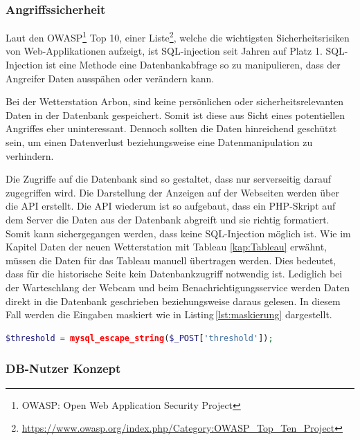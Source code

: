 \subsubsection{Angriffssicherheit}
Laut den OWASP\footnote{OWASP: Open Web Application Security Project} Top 10, einer Liste\footnote{ \url{https://www.owasp.org/index.php/Category:OWASP_Top_Ten_Project}}, welche die wichtigsten Sicherheitsrisiken von Web-Applikationen aufzeigt, ist SQL-injection seit Jahren auf Platz 1. SQL-Injection ist eine Methode eine Datenbankabfrage so zu manipulieren, dass der Angreifer Daten ausspähen oder verändern kann.

Bei der Wetterstation Arbon, sind keine persönlichen oder sicherheitsrelevanten Daten in der Datenbank gespeichert. Somit ist diese aus Sicht eines potentiellen Angriffes eher uninteressant. Dennoch sollten die Daten hinreichend geschützt sein, um einen Datenverlust beziehungsweise eine Datenmanipulation zu verhindern.

Die Zugriffe auf die Datenbank sind so gestaltet, dass nur serverseitig darauf zugegriffen wird. Die Darstellung der Anzeigen auf der Webseiten werden über die API erstellt. Die API wiederum ist so aufgebaut, dass ein PHP-Skript auf dem Server die Daten aus der Datenbank abgreift und sie richtig formatiert. Somit kann sichergegangen werden, dass keine SQL-Injection möglich ist. Wie im Kapitel Daten der neuen Wetterstation mit Tableau \ref{kap:Tableau} erwähnt, müssen die Daten für das Tableau manuell übertragen werden. Dies bedeutet, dass für die historische Seite kein Datenbankzugriff notwendig ist. Lediglich bei der Warteschlang der Webcam und beim Benachrichtigungsservice werden Daten direkt in die Datenbank geschrieben beziehungsweise daraus gelesen. In diesem Fall werden die Eingaben maskiert wie in Listing\,\ref{lst:maskierung} dargestellt.

\begin{lstlisting}[label=lst:maskierung,caption=Maskierung von Datenbank-Eingaben, language=PHP, style=PHP]
$threshold = mysql_escape_string($_POST['threshold']);
\end{lstlisting}


\subsubsection{DB-Nutzer Konzept}

